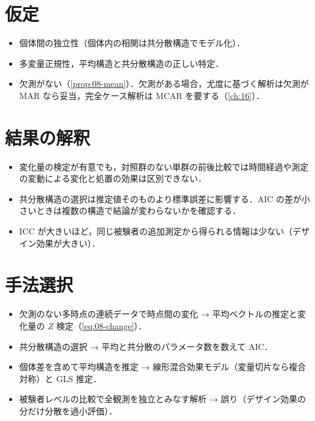 \documentclass[a4paper,11pt,openany]{ltjsbook}
\begin{document}
\section{仮定}\label{sec:08-assump}
\begin{itemize}
\item 個体間の独立性（個体内の相関は共分散構造でモデル化）．
\item 多変量正規性，平均構造と共分散構造の正しい特定．
\item 欠測がない（\cref{prop:08-mean}）．欠測がある場合，尤度に基づく解析は欠測が MAR なら妥当，完全ケース解析は MCAR を要する（\cref{ch:16}）．
\end{itemize}

\section{結果の解釈}\label{sec:08-interp}
\begin{itemize}
\item 変化量の検定が有意でも，対照群のない単群の前後比較では時間経過や測定の変動による変化と処置の効果は区別できない．
\item 共分散構造の選択は推定値そのものより標準誤差に影響する．AIC の差が小さいときは複数の構造で結論が変わらないかを確認する．
\item ICC が大きいほど，同じ被験者の追加測定から得られる情報は少ない（デザイン効果が大きい）．
\end{itemize}

\section{手法選択}\label{sec:08-choice}
\begin{itemize}
\item 欠測のない多時点の連続データで時点間の変化 → 平均ベクトルの推定と変化量の $Z$ 検定（\cref{eq:08-change}）．
\item 共分散構造の選択 → 平均と共分散のパラメータ数を数えて AIC．
\item 個体差を含めて平均構造を推定 → 線形混合効果モデル（変量切片なら複合対称）と GLS 推定．
\item 被験者レベルの比較で全観測を独立とみなす解析 → 誤り（デザイン効果の分だけ分散を過小評価）．
\end{itemize}
\end{document}
